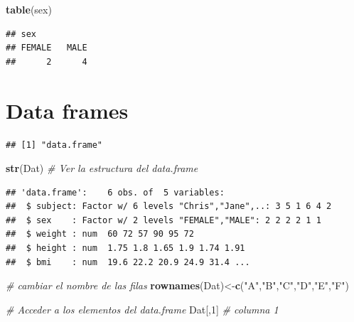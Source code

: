 \documentclass[]{book}
\newenvironment{Shaded}{\begin{snugshade}}{\end{snugshade}}
\newcommand{\KeywordTok}[1]{\textcolor[rgb]{0.13,0.29,0.53}{\textbf{#1}}}
\newcommand{\DecValTok}[1]{\textcolor[rgb]{0.00,0.00,0.81}{#1}}
\newcommand{\StringTok}[1]{\textcolor[rgb]{0.31,0.60,0.02}{#1}}
\newcommand{\CommentTok}[1]{\textcolor[rgb]{0.56,0.35,0.01}{\textit{#1}}}
\newcommand{\OperatorTok}[1]{\textcolor[rgb]{0.81,0.36,0.00}{\textbf{#1}}}
\newcommand{\NormalTok}[1]{#1}
\begin{document}
\begin{Shaded}
\begin{Highlighting}[]
\KeywordTok{table}\NormalTok{(sex)}
\end{Highlighting}
\end{Shaded}

\begin{verbatim}
## sex
## FEMALE   MALE 
##      2      4
\end{verbatim}

\section{Data frames}\label{data-frames}

\begin{Shaded}
\end{Shaded}

\begin{verbatim}
## [1] "data.frame"
\end{verbatim}

\begin{Shaded}
\begin{Highlighting}[]
\KeywordTok{str}\NormalTok{(Dat) }\CommentTok{# Ver la estructura del data.frame}
\end{Highlighting}
\end{Shaded}

\begin{verbatim}
## 'data.frame':    6 obs. of  5 variables:
##  $ subject: Factor w/ 6 levels "Chris","Jane",..: 3 5 1 6 4 2
##  $ sex    : Factor w/ 2 levels "FEMALE","MALE": 2 2 2 2 1 1
##  $ weight : num  60 72 57 90 95 72
##  $ height : num  1.75 1.8 1.65 1.9 1.74 1.91
##  $ bmi    : num  19.6 22.2 20.9 24.9 31.4 ...
\end{verbatim}

\begin{Shaded}
\begin{Highlighting}[]
\CommentTok{# cambiar el nombre de las filas}
\KeywordTok{rownames}\NormalTok{(Dat)<-}\KeywordTok{c}\NormalTok{(}\StringTok{"A"}\NormalTok{,}\StringTok{"B"}\NormalTok{,}\StringTok{"C"}\NormalTok{,}\StringTok{"D"}\NormalTok{,}\StringTok{"E"}\NormalTok{,}\StringTok{"F"}\NormalTok{)}

\CommentTok{# Acceder a los elementos del data.frame}
\NormalTok{Dat[,}\DecValTok{1}\NormalTok{]     }\CommentTok{# columna 1}
\end{Highlighting}
\end{Shaded}
\end{document}

